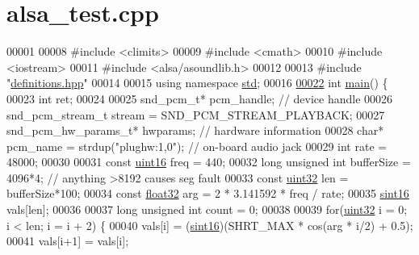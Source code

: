 \hypertarget{alsa__test_8cpp_source}{\section{alsa\+\_\+test.\+cpp}
\label{alsa__test_8cpp_source}
}

\begin{DoxyCode}
00001 
00008 \textcolor{preprocessor}{#include <climits>}
00009 \textcolor{preprocessor}{#include <cmath>}
00010 \textcolor{preprocessor}{#include <iostream>}
00011 \textcolor{preprocessor}{#include <alsa/asoundlib.h>}
00012 
00013 \textcolor{preprocessor}{#include "\hyperlink{definitions_8hpp}{definitions.hpp}"}
00014 
00015 \textcolor{keyword}{using namespace }\hyperlink{namespacestd}{std};
00016 
\hypertarget{alsa__test_8cpp_source_l00022}{}\hyperlink{alsa__test_8cpp_ae66f6b31b5ad750f1fe042a706a4e3d4}{00022} \textcolor{keywordtype}{int} \hyperlink{alsa__test_8cpp_ae66f6b31b5ad750f1fe042a706a4e3d4}{main}() \{
00023     \textcolor{keywordtype}{int} ret;
00024 
00025     snd\_pcm\_t* pcm\_handle;  \textcolor{comment}{// device handle}
00026     snd\_pcm\_stream\_t stream = SND\_PCM\_STREAM\_PLAYBACK;
00027     snd\_pcm\_hw\_params\_t* hwparams;  \textcolor{comment}{// hardware information}
00028     \textcolor{keywordtype}{char}* pcm\_name = strdup(\textcolor{stringliteral}{"plughw:1,0"});  \textcolor{comment}{// on-board audio jack}
00029     \textcolor{keywordtype}{int} rate = 48000;
00030 
00031     \textcolor{keyword}{const} \hyperlink{definitions_8hpp_a05f6b0ae8f6a6e135b0e290c25fe0e4e}{uint16} freq = 440;
00032     \textcolor{keywordtype}{long} \textcolor{keywordtype}{unsigned} \textcolor{keywordtype}{int} bufferSize = 4096*4;  \textcolor{comment}{// anything >8192 causes seg fault}
00033     \textcolor{keyword}{const} \hyperlink{definitions_8hpp_a1134b580f8da4de94ca6b1de4d37975e}{uint32} len = bufferSize*100;
00034     \textcolor{keyword}{const} \hyperlink{definitions_8hpp_aacdc525d6f7bddb3ae95d5c311bd06a1}{float32} arg = 2 * 3.141592 * freq / rate;
00035     \hyperlink{definitions_8hpp_a74df79fde3c518e55b29ce6360a9c76e}{sint16} vals[len];
00036 
00037     \textcolor{keywordtype}{long} \textcolor{keywordtype}{unsigned} \textcolor{keywordtype}{int} count = 0;
00038 
00039     \textcolor{keywordflow}{for}(\hyperlink{definitions_8hpp_a1134b580f8da4de94ca6b1de4d37975e}{uint32} i = 0; i < len; i = i + 2) \{
00040         vals[i] = (\hyperlink{definitions_8hpp_a74df79fde3c518e55b29ce6360a9c76e}{sint16})(SHRT\_MAX * cos(arg * i/2) + 0.5);
00041         vals[i+1] = vals[i];

\end{DoxyCode}
